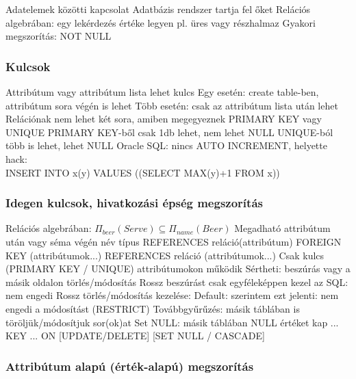 \documentclass[12pt,a4paper]{article}
\begin{document}
\begin{outline}
	\1 Adatelemek közötti kapcsolat
	\1 Adatbázis rendszer tartja fel őket
	\1 Relációs algebrában: egy lekérdezés értéke legyen pl. üres vagy részhalmaz
	\1 Gyakori megszorítás: NOT NULL
\end{outline}

\subsubsection{Kulcsok}

\begin{outline}
	\1 Attribútum vagy attribútum lista lehet kulcs
		\2 Egy esetén: create table-ben, attribútum sora végén is lehet
		\2 Több esetén: csak az attribútum lista után lehet
	\1 Relációnak nem lehet két sora, amiben megegyeznek
	\1 PRIMARY KEY vagy UNIQUE
		\2 PRIMARY KEY-ből csak 1db lehet, nem lehet NULL
		\2 UNIQUE-ból több is lehet, lehet NULL
	\1 Oracle SQL: nincs AUTO INCREMENT, helyette hack:\\
	INSERT INTO x(y) VALUES ((SELECT MAX(y)+1 FROM x))
\end{outline}

\subsubsection{Idegen kulcsok, hivatkozási épség megszorítás}

\begin{outline}
	\1 Relációs algebrában: $\Pi_{beer}(Serve) \subseteq \Pi_{name}(Beer)$
	\1 Megadható attribútum után vagy séma végén
		\2 név típus REFERENCES reláció(attribútum)
		\2 FOREIGN KEY (attribútumok...) REFERENCES reláció (attribútumok...)
	\1 Csak kulcs (PRIMARY KEY / UNIQUE) attribútumokon működik
	\1 Sértheti: beszúrás vagy a másik oldalon törlés/módosítás
		\2 Rossz beszúrást csak egyféleképpen kezel az SQL: nem engedi
		\2 Rossz törlés/módosítás kezelése:
			\3 Default: szerintem ezt jelenti: nem engedi a módosítást (RESTRICT)
			\3 Továbbgyűrűzés: másik táblában is töröljük/módosítjuk sor(ok)at
			\3 Set NULL: másik táblában NULL értéket kap
			\3 ... KEY ... ON [UPDATE/DELETE] [SET NULL / CASCADE]
\end{outline}

\pagebreak

\subsubsection{Attribútum alapú (érték-alapú) megszorítás}
\end{document}
